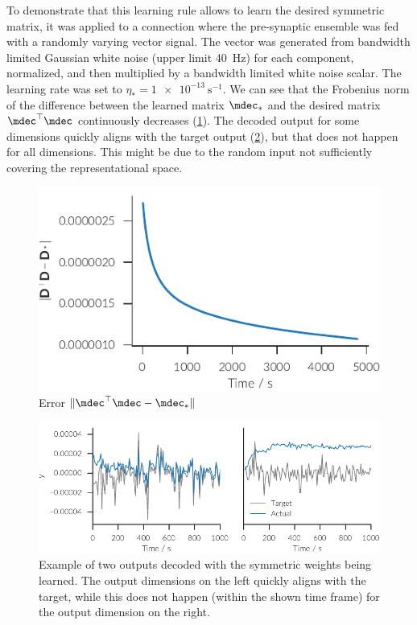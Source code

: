 To demonstrate that this learning rule allows to learn the desired symmetric matrix, it was applied to a connection where the pre-synaptic ensemble was fed with a randomly varying vector signal.
The vector was generated from bandwidth limited Gaussian white noise (upper limit \SI{40}{\hertz}) for each component, normalized, and then multiplied by a bandwidth limited white noise scalar.
The learning rate was set to $\eta_* = \SI{1e-13}{\second^{-1}}$.
We can see that the Frobenius norm of the difference between the learned matrix $\mdec_*$ and the desired matrix $\mdec\Tr\mdec$ continuously decreases (\cref{fig:aml:grad-err}).
The decoded output for some dimensions quickly aligns with the target output (\cref{fig:aml:grad-decode}), but that does not happen for all dimensions.
This might be due to the random input not sufficiently covering the representational space.
\begin{figure}
    \centering
    \includegraphics{figures/aml-grad-err}
    \caption{Error $\lVert \mdec\Tr\mdec - \mdec_*\rVert$}\label{fig:aml:grad-err}
\end{figure}
\begin{figure}
    \centering
    \includegraphics{figures/aml-decode}
    \caption[Example of two outputs decoded with the symmetric weights being learned]{Example of two outputs decoded with the symmetric weights being learned. The output dimensions on the left quickly aligns with the target, while this does not happen (within the shown time frame) for the output dimension on the right.}\label{fig:aml:grad-decode}
\end{figure}


